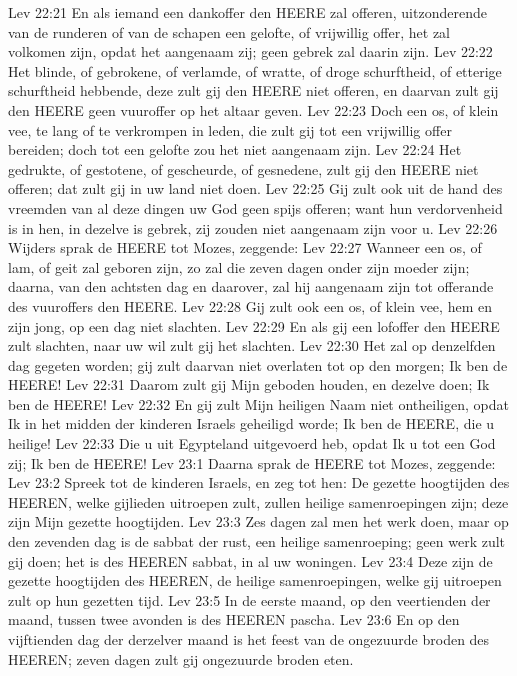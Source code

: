 Lev 22:21  En als iemand een dankoffer den HEERE zal offeren, uitzonderende van de runderen of van de schapen een gelofte, of vrijwillig offer, het zal volkomen zijn, opdat het aangenaam zij; geen gebrek zal daarin zijn.
Lev 22:22  Het blinde, of gebrokene, of verlamde, of wratte, of droge schurftheid, of etterige schurftheid hebbende, deze zult gij den HEERE niet offeren, en daarvan zult gij den HEERE geen vuuroffer op het altaar geven.
Lev 22:23  Doch een os, of klein vee, te lang of te verkrompen in leden, die zult gij tot een vrijwillig offer bereiden; doch tot een gelofte zou het niet aangenaam zijn.
Lev 22:24  Het gedrukte, of gestotene, of gescheurde, of gesnedene, zult gij den HEERE niet offeren; dat zult gij in uw land niet doen.
Lev 22:25  Gij zult ook uit de hand des vreemden van al deze dingen uw God geen spijs offeren; want hun verdorvenheid is in hen, in dezelve is gebrek, zij zouden niet aangenaam zijn voor u.
Lev 22:26  Wijders sprak de HEERE tot Mozes, zeggende:
Lev 22:27  Wanneer een os, of lam, of geit zal geboren zijn, zo zal die zeven dagen onder zijn moeder zijn; daarna, van den achtsten dag en daarover, zal hij aangenaam zijn tot offerande des vuuroffers den HEERE.
Lev 22:28  Gij zult ook een os, of klein vee, hem en zijn jong, op een dag niet slachten.
Lev 22:29  En als gij een lofoffer den HEERE zult slachten, naar uw wil zult gij het slachten.
Lev 22:30  Het zal op denzelfden dag gegeten worden; gij zult daarvan niet overlaten tot op den morgen; Ik ben de HEERE!
Lev 22:31  Daarom zult gij Mijn geboden houden, en dezelve doen; Ik ben de HEERE!
Lev 22:32  En gij zult Mijn heiligen Naam niet ontheiligen, opdat Ik in het midden der kinderen Israels geheiligd worde; Ik ben de HEERE, die u heilige!
Lev 22:33  Die u uit Egypteland uitgevoerd heb, opdat Ik u tot een God zij; Ik ben de HEERE!
Lev 23:1  Daarna sprak de HEERE tot Mozes, zeggende:
Lev 23:2  Spreek tot de kinderen Israels, en zeg tot hen: De gezette hoogtijden des HEEREN, welke gijlieden uitroepen zult, zullen heilige samenroepingen zijn; deze zijn Mijn gezette hoogtijden.
Lev 23:3  Zes dagen zal men het werk doen, maar op den zevenden dag is de sabbat der rust, een heilige samenroeping; geen werk zult gij doen; het is des HEEREN sabbat, in al uw woningen.
Lev 23:4  Deze zijn de gezette hoogtijden des HEEREN, de heilige samenroepingen, welke gij uitroepen zult op hun gezetten tijd.
Lev 23:5  In de eerste maand, op den veertienden der maand, tussen twee avonden is des HEEREN pascha.
Lev 23:6  En op den vijftienden dag der derzelver maand is het feest van de ongezuurde broden des HEEREN; zeven dagen zult gij ongezuurde broden eten.
